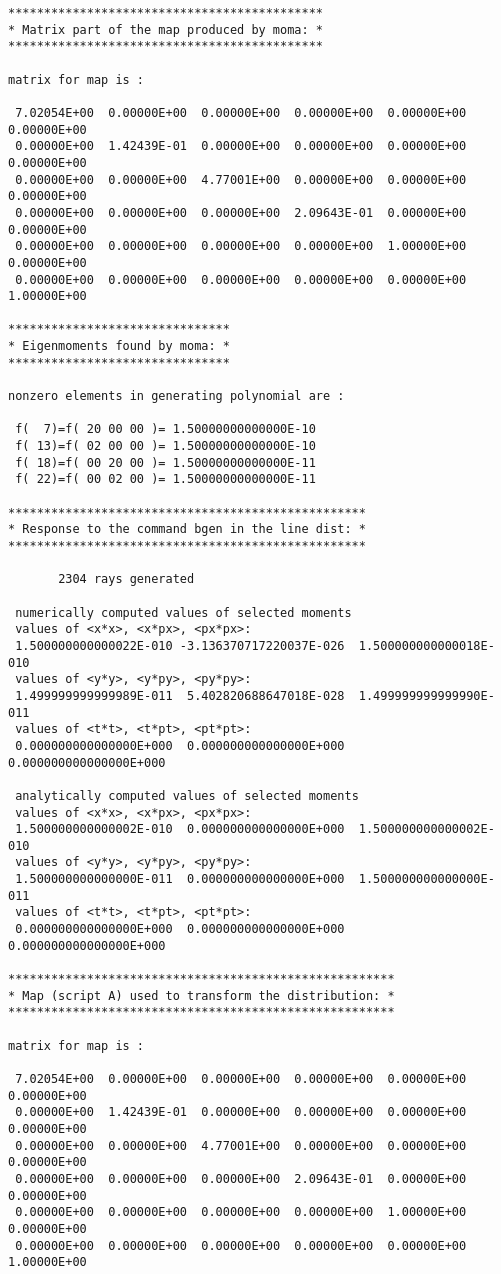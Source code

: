 \begin{footnotesize}
\begin{verbatim}
********************************************
* Matrix part of the map produced by moma: *
********************************************

matrix for map is :

 7.02054E+00  0.00000E+00  0.00000E+00  0.00000E+00  0.00000E+00  0.00000E+00
 0.00000E+00  1.42439E-01  0.00000E+00  0.00000E+00  0.00000E+00  0.00000E+00
 0.00000E+00  0.00000E+00  4.77001E+00  0.00000E+00  0.00000E+00  0.00000E+00
 0.00000E+00  0.00000E+00  0.00000E+00  2.09643E-01  0.00000E+00  0.00000E+00
 0.00000E+00  0.00000E+00  0.00000E+00  0.00000E+00  1.00000E+00  0.00000E+00
 0.00000E+00  0.00000E+00  0.00000E+00  0.00000E+00  0.00000E+00  1.00000E+00

*******************************
* Eigenmoments found by moma: *
*******************************

nonzero elements in generating polynomial are :

 f(  7)=f( 20 00 00 )= 1.50000000000000E-10
 f( 13)=f( 02 00 00 )= 1.50000000000000E-10
 f( 18)=f( 00 20 00 )= 1.50000000000000E-11
 f( 22)=f( 00 02 00 )= 1.50000000000000E-11

**************************************************
* Response to the command bgen in the line dist: *
**************************************************

       2304 rays generated

 numerically computed values of selected moments
 values of <x*x>, <x*px>, <px*px>:
 1.500000000000022E-010 -3.136370717220037E-026  1.500000000000018E-010
 values of <y*y>, <y*py>, <py*py>:
 1.499999999999989E-011  5.402820688647018E-028  1.499999999999990E-011
 values of <t*t>, <t*pt>, <pt*pt>:
 0.000000000000000E+000  0.000000000000000E+000  0.000000000000000E+000

 analytically computed values of selected moments
 values of <x*x>, <x*px>, <px*px>:
 1.500000000000002E-010  0.000000000000000E+000  1.500000000000002E-010
 values of <y*y>, <y*py>, <py*py>:
 1.500000000000000E-011  0.000000000000000E+000  1.500000000000000E-011
 values of <t*t>, <t*pt>, <pt*pt>:
 0.000000000000000E+000  0.000000000000000E+000  0.000000000000000E+000

******************************************************
* Map (script A) used to transform the distribution: *
******************************************************

matrix for map is :

 7.02054E+00  0.00000E+00  0.00000E+00  0.00000E+00  0.00000E+00  0.00000E+00
 0.00000E+00  1.42439E-01  0.00000E+00  0.00000E+00  0.00000E+00  0.00000E+00
 0.00000E+00  0.00000E+00  4.77001E+00  0.00000E+00  0.00000E+00  0.00000E+00
 0.00000E+00  0.00000E+00  0.00000E+00  2.09643E-01  0.00000E+00  0.00000E+00
 0.00000E+00  0.00000E+00  0.00000E+00  0.00000E+00  1.00000E+00  0.00000E+00
 0.00000E+00  0.00000E+00  0.00000E+00  0.00000E+00  0.00000E+00  1.00000E+00


\end{verbatim}
\end{footnotesize}
